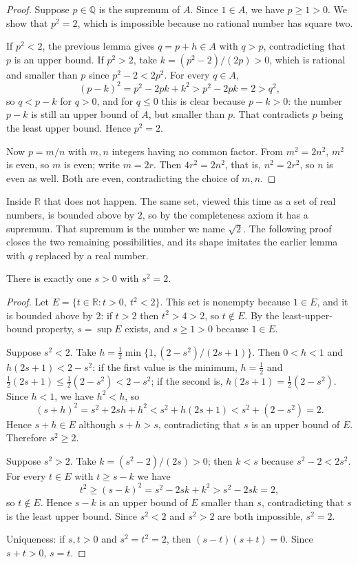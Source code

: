 \begin{proof}
Suppose $p\in\mathbb{Q}$ is the supremum of $A$. Since $1\in A$, we have $p\ge 1>0$. We
show that $p^2=2$, which is impossible because no rational number has square two.

If $p^2<2$, the previous lemma gives $q=p+h\in A$ with $q>p$, contradicting that $p$
is an upper bound. If $p^2>2$, take $k=(p^2-2)/(2p)>0$, which is rational and smaller
than $p$ since $p^2-2<2p^2$. For every $q\in A$,
\[
(p-k)^2=p^2-2pk+k^2>p^2-2pk=2>q^2,
\]
so $q<p-k$ for $q>0$, and for $q\le 0$ this is clear because $p-k>0$: the number
$p-k$ is still an upper bound of $A$, but smaller than $p$.
That contradicts $p$ being the least upper bound. Hence $p^2=2$.

Now $p=m/n$ with $m,n$ integers having no common factor. From $m^2=2n^2$, $m^2$ is
even, so $m$ is even; write $m=2r$. Then $4r^2=2n^2$, that is, $n^2=2r^2$, so $n$
is even as well. Both are even, contradicting the choice of $m,n$.
\end{proof}

Inside $\mathbb{R}$ that does not happen. The same set, viewed this time as a set of
real numbers, is bounded above by $2$, so by the completeness axiom it has a supremum.
That supremum is the number we name $\sqrt{2}$. The following proof closes the two
remaining possibilities, and its shape imitates the earlier lemma with $q$ replaced by
a real number.

\begin{teorema}
There is exactly one $s>0$ with $s^2=2$.
\end{teorema}

\begin{proof}
Let $E=\{t\in\mathbb{R}: t>0,\ t^2<2\}$. This set is nonempty because $1\in E$, and it
is bounded above by $2$: if $t>2$ then $t^2>4>2$, so $t\notin E$. By the
least-upper-bound property, $s=\sup E$ exists, and $s\ge 1>0$ because $1\in E$.

Suppose $s^2<2$. Take $h=\frac12\min\{1,(2-s^2)/(2s+1)\}$. Then $0<h<1$ and
$h(2s+1)<2-s^2$: if the first value is the minimum, $h=\frac12$ and
$\frac12(2s+1)\le\frac12(2-s^2)<2-s^2$; if the second is, $h(2s+1)=\frac12(2-s^2)$.
Since $h<1$, we have $h^2<h$, so
\[
(s+h)^2=s^2+2sh+h^2<s^2+h(2s+1)<s^2+(2-s^2)=2 .
\]
Hence $s+h\in E$ although $s+h>s$, contradicting that $s$ is an upper bound of $E$.
Therefore $s^2\ge 2$.

Suppose $s^2>2$. Take $k=(s^2-2)/(2s)>0$; then $k<s$ because $s^2-2<2s^2$. For every
$t\in E$ with $t\ge s-k$ we have
\[
t^2\ge(s-k)^2=s^2-2sk+k^2>s^2-2sk=2,
\]
so $t\notin E$. Hence $s-k$ is an upper bound of $E$ smaller than $s$, contradicting
that $s$ is the least upper bound. Since $s^2<2$ and $s^2>2$ are both impossible,
$s^2=2$.

Uniqueness: if $s,t>0$ and $s^2=t^2=2$, then $(s-t)(s+t)=0$. Since $s+t>0$, $s=t$.
\end{proof}

